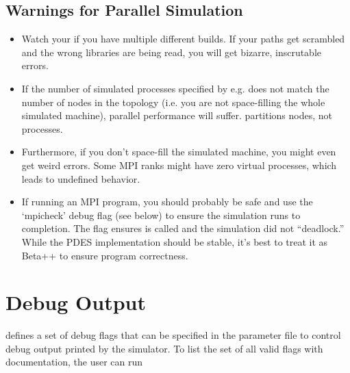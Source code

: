 \subsection{Warnings for Parallel Simulation}
\label{subsec:parallelwarn}
\begin{itemize}
\item Watch your  if you have multiple different builds. If your paths get scrambled and the wrong libraries are being read, you will get bizarre, inscrutable errors.
\item If the number of simulated processes specified by e.g.  does not match the number of nodes in the topology (i.e. you are not space-filling the whole simulated machine),
parallel performance will suffer. \sstmacro partitions nodes, not processes.
\item Furthermore, if you don't space-fill the simulated machine, you might even get weird errors. Some MPI ranks might have zero virtual processes, which leads to undefined behavior.
\item If running an MPI program,  you should probably be safe and use the `mpicheck' debug flag (see below) to ensure the simulation runs to completion.
The flag ensures  is called and the simulation did not ``deadlock.''
While the PDES implementation should be stable, it's best to treat it as Beta++ to ensure program correctness.
\end{itemize}


\section{Debug Output}
\label{sec:dbgoutput}
\sstmacro defines a set of debug flags that can be specified in the parameter file to control debug output printed by the simulator.
To list the set of all valid flags with documentation, the user can run


